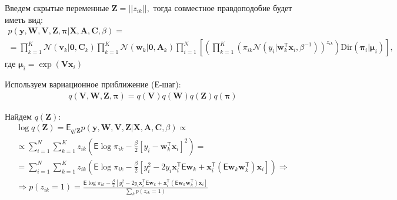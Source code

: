\documentclass[12pt, twoside]{article}
\numberwithin{equation}{section}
\begin{document}
Введем скрытые переменные $\textbf{Z} = ||z_{ik}||,$ тогда совместное правдоподобие будет иметь вид:
\begin{equation}
\label{eq:st:29}
\begin{aligned}
p\left(\textbf{y}, \textbf{W}, \textbf{V}, \textbf{Z}, \bm{\pi}|\textbf{X}, \textbf{A}, \textbf{C}, \beta\right) = \\
= \prod_{k=1}^{K}\mathcal{N}\left(\textbf{v}_k|\textbf{0}, \textbf{C}_k\right)\prod_{k=1}^{K}\mathcal{N}\left(\textbf{w}_k|\textbf{0}, \textbf{A}_k\right)
\prod_{i=1}^{N}\left[\left(\prod_{k=1}^{K}\left(\pi_{ik}\mathcal{N}\left(y_i|\textbf{w}_{k}^{\mathsf{T}}\textbf{x}_i, \beta^{-1}\right)\right)^{z_{ik}}\right)\text{Dir}\left(\bm{\pi}_i|\bm{\mu}_i\right)\right],
\end{aligned}
\end{equation}
где $\bm{\mu}_i = \exp\left(\textbf{V}\textbf{x}_i\right)$

Используем вариационное приближение (Е-шаг):
\begin{equation}
\label{eq:st:30}
\begin{aligned}
q\left(\textbf{V}, \textbf{W}, \textbf{Z}, \bm{\pi}\right) = q\left(\textbf{V}\right)q\left(\textbf{W}\right)q\left(\textbf{Z}\right)q\left(\bm{\pi}\right)
\end{aligned}
\end{equation}

Найдем $q\left(\textbf{Z}\right)$:
\begin{equation}
\label{eq:st:31}
\begin{aligned}
\log q\left(\textbf{Z}\right) =\mathsf{E}_{q/\textbf{Z}}p\left(\textbf{y}, \textbf{W}, \textbf{V}, \textbf{Z}|\textbf{X}, \textbf{A}, \textbf{C}, \beta\right) \propto \\
\propto \sum_{i=1}^{N}\sum_{k=1}^{K}z_{ik}\left(\mathsf{E}\log\pi_{ik} - \frac{\beta}{2}\left[y_i-\textbf{w}_k^{\mathsf{T}}\textbf{x}_i\right]^2\right)=\\
= \sum_{i=1}^{N}\sum_{k=1}^{K}z_{ik}\left(\mathsf{E}\log\pi_{ik} - \frac{\beta}{2}\left[y_{i}^{2}-2y_i\textbf{x}_{i}^{\mathsf{T}}\mathsf{E}\textbf{w}_{k} + \textbf{x}_{i}^{\mathsf{T}}\left(\mathsf{E}\textbf{w}_{k}\textbf{w}_{k}^{\mathsf{T}}\right)\textbf{x}_i\right]\right) \Rightarrow \\
\Rightarrow p\left(z_{ik} = 1\right) = \frac{\mathsf{E}\log\pi_{ik} - \frac{\beta}{2}\left[y_{i}^{2}-2y_i\textbf{x}_{i}^{\mathsf{T}}\mathsf{E}\textbf{w}_{k} + \textbf{x}_{i}^{\mathsf{T}}\left(\mathsf{E}\textbf{w}_{k}\textbf{w}_{k}^{\mathsf{T}}\right)\textbf{x}_i\right]}{\sum_{k} p\left(z_{ik} = 1\right)}
\end{aligned}
\end{equation}
\end{document}
